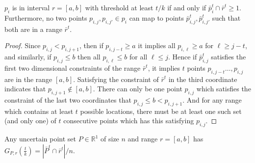 \documentclass[11pt]{myclass}
\newcommand{\bl}[1]{\ensuremath{\mathbb{#1}}}
\begin{document}
\begin{lemma}
$p_i$ is in interval $r = [a,b]$ with threshold at least $t/k$ if and only if $\bar{p}^t_i \cap \bar{r}^t \geq 1$.
Furthermore, no two points $p_{i,j}, p_{i,j'} \in p_i$ can map to points $\bar{p}^t_{i,j}, \bar{p}^t_{i,j'}$ such that both are in a range $\bar{r}^t$.  
\end{lemma}
 
\begin{proof}
Since $p_{i,j} < p_{i,j+1}$, then if $p_{i,j-t} \geq a$ it implies all $p_{i,\ell} \geq a$ for $\ell \geq j-t$, and similarly, if $p_{i,j} \leq b$ then all $p_{i,\ell} \leq b$ for all $\ell \leq j$.  Hence if $\bar{p}^t_{i,j}$ satisfies the first two dimensional constraints of the range $\bar{r}^t$, it implies $t$ points $p_{i,j-t} \ldots, p_{i,j}$ are in the range $[a,b]$.  
Satisfying the constraint of $\bar{r}^t$ in the third coordinate indicates that $p_{i,j+1} \notin [a,b]$.  There can only be one point $p_{i,j}$ which satisfies the constraint of the last two coordinates that $p_{i,j} \leq b < p_{i,j+1}$.  And for any range which contains at least $t$ possible locations, there must be at least one such set (and only one) of $t$ consecutive points which has this satisfying $p_{i,j}$.  
\end{proof}

\begin{corollary}
Any uncertain point set $P \in \bl{R}^1$ of size $n$ and range $r = [a,b]$ has $G_{P, r}(\frac{t}{k}) = |\bar{P}^t \cap \bar{r}^t|/n$.  
\end{corollary}
\end{document}
